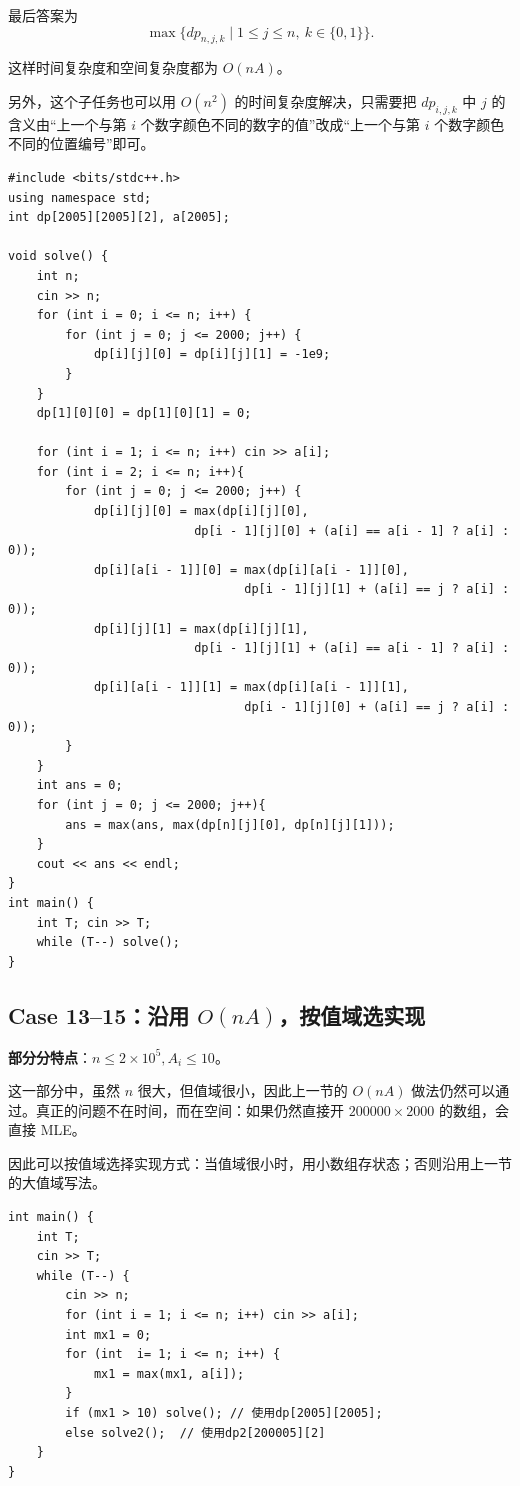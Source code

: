 \documentclass{book}
\begin{document}
    最后答案为
    \[
    \max \{ dp_{n,j,k} \mid 1 \leq j \leq n,\ k \in \{0,1\} \}.
    \]

    这样时间复杂度和空间复杂度都为 $O(nA)$。

    另外，这个子任务也可以用 $O(n^2)$ 的时间复杂度解决，只需要把 $dp_{i,j,k}$ 中 $j$ 的含义由“上一个与第 $i$ 个数字颜色不同的数字的值”改成“上一个与第 $i$ 个数字颜色不同的位置编号”即可。
    

    \newpage
        \begin{lstlisting}[style = code]
#include <bits/stdc++.h>
using namespace std;
int dp[2005][2005][2], a[2005]; 

void solve() {
    int n;
    cin >> n;
    for (int i = 0; i <= n; i++) {
        for (int j = 0; j <= 2000; j++) {
            dp[i][j][0] = dp[i][j][1] = -1e9;
        }
    }
    dp[1][0][0] = dp[1][0][1] = 0;
    
    for (int i = 1; i <= n; i++) cin >> a[i];
    for (int i = 2; i <= n; i++){
        for (int j = 0; j <= 2000; j++) {
            dp[i][j][0] = max(dp[i][j][0], 
                          dp[i - 1][j][0] + (a[i] == a[i - 1] ? a[i] : 0));
            dp[i][a[i - 1]][0] = max(dp[i][a[i - 1]][0], 
                                 dp[i - 1][j][1] + (a[i] == j ? a[i] : 0));
            dp[i][j][1] = max(dp[i][j][1], 
                          dp[i - 1][j][1] + (a[i] == a[i - 1] ? a[i] : 0));
            dp[i][a[i - 1]][1] = max(dp[i][a[i - 1]][1], 
                                 dp[i - 1][j][0] + (a[i] == j ? a[i] : 0));
        }
    }
    int ans = 0;
    for (int j = 0; j <= 2000; j++){
        ans = max(ans, max(dp[n][j][0], dp[n][j][1]));
    }
    cout << ans << endl;
}
int main() {
    int T; cin >> T;
    while (T--) solve();
}
\end{lstlisting}
\newpage

    \subsection{Case 13--15：沿用 $O(nA)$，按值域选实现}

    \textbf{部分分特点}：$n\leq 2\times 10^5, A_i\leq 10$。

    这一部分中，虽然 $n$ 很大，但值域很小，因此上一节的 $O(nA)$ 做法仍然可以通过。真正的问题不在时间，而在空间：如果仍然直接开 $200000\times 2000$ 的数组，会直接 MLE。

    因此可以按值域选择实现方式：当值域很小时，用小数组存状态；否则沿用上一节的大值域写法。

    \begin{lstlisting}[style = code]
int main() {
    int T;
    cin >> T;
    while (T--) {
        cin >> n;
        for (int i = 1; i <= n; i++) cin >> a[i];
        int mx1 = 0;
        for (int  i= 1; i <= n; i++) {
            mx1 = max(mx1, a[i]);
        }
        if (mx1 > 10) solve(); // 使用dp[2005][2005];
        else solve2();  // 使用dp2[200005][2]
    }
}
    \end{lstlisting}
\end{document}
